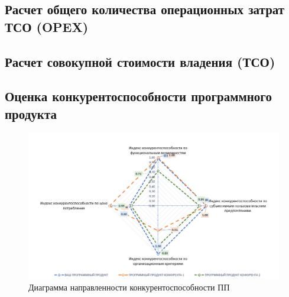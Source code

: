 \subsection{Расчет общего количества операционных затрат ТСО (OPEX)}

\subsection{Расчет совокупной стоимости владения (ТСО)}

\subsection{Оценка конкурентоспособности программного продукта}

\begin{figure}[H]
	\centering
	\includegraphics[width=\textwidth]{images/ec_competitive_chart.png}
	\parskip=6pt
	\caption{Диаграмма направленности конкурентоспособности ПП}
	\label{fig:competitive}
\end{figure}